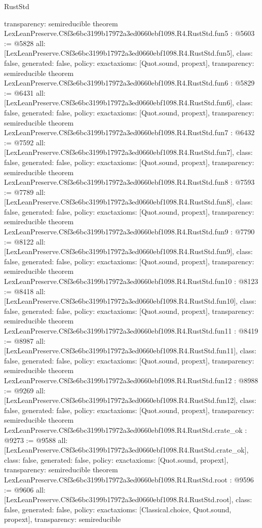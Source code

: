 \begin{lexlean}{RustStd}
\begin{coremodule}
{  transparency: semireducible
}
theorem LexLeanPreserve.C8f3e6bc3199b17972a3ed0660ebf1098.R4.RustStd.fun5 : @5603 := @5828 {
  all: [LexLeanPreserve.C8f3e6bc3199b17972a3ed0660ebf1098.R4.RustStd.fun5],
  class: false,
  generated: false,
  policy: exact{axioms: [Quot.sound, propext]},
  transparency: semireducible
}
theorem LexLeanPreserve.C8f3e6bc3199b17972a3ed0660ebf1098.R4.RustStd.fun6 : @5829 := @6431 {
  all: [LexLeanPreserve.C8f3e6bc3199b17972a3ed0660ebf1098.R4.RustStd.fun6],
  class: false,
  generated: false,
  policy: exact{axioms: [Quot.sound, propext]},
  transparency: semireducible
}
theorem LexLeanPreserve.C8f3e6bc3199b17972a3ed0660ebf1098.R4.RustStd.fun7 : @6432 := @7592 {
  all: [LexLeanPreserve.C8f3e6bc3199b17972a3ed0660ebf1098.R4.RustStd.fun7],
  class: false,
  generated: false,
  policy: exact{axioms: [Quot.sound, propext]},
  transparency: semireducible
}
theorem LexLeanPreserve.C8f3e6bc3199b17972a3ed0660ebf1098.R4.RustStd.fun8 : @7593 := @7789 {
  all: [LexLeanPreserve.C8f3e6bc3199b17972a3ed0660ebf1098.R4.RustStd.fun8],
  class: false,
  generated: false,
  policy: exact{axioms: [Quot.sound, propext]},
  transparency: semireducible
}
theorem LexLeanPreserve.C8f3e6bc3199b17972a3ed0660ebf1098.R4.RustStd.fun9 : @7790 := @8122 {
  all: [LexLeanPreserve.C8f3e6bc3199b17972a3ed0660ebf1098.R4.RustStd.fun9],
  class: false,
  generated: false,
  policy: exact{axioms: [Quot.sound, propext]},
  transparency: semireducible
}
theorem LexLeanPreserve.C8f3e6bc3199b17972a3ed0660ebf1098.R4.RustStd.fun10 : @8123 := @8418 {
  all: [LexLeanPreserve.C8f3e6bc3199b17972a3ed0660ebf1098.R4.RustStd.fun10],
  class: false,
  generated: false,
  policy: exact{axioms: [Quot.sound, propext]},
  transparency: semireducible
}
theorem LexLeanPreserve.C8f3e6bc3199b17972a3ed0660ebf1098.R4.RustStd.fun11 : @8419 := @8987 {
  all: [LexLeanPreserve.C8f3e6bc3199b17972a3ed0660ebf1098.R4.RustStd.fun11],
  class: false,
  generated: false,
  policy: exact{axioms: [Quot.sound, propext]},
  transparency: semireducible
}
theorem LexLeanPreserve.C8f3e6bc3199b17972a3ed0660ebf1098.R4.RustStd.fun12 : @8988 := @9269 {
  all: [LexLeanPreserve.C8f3e6bc3199b17972a3ed0660ebf1098.R4.RustStd.fun12],
  class: false,
  generated: false,
  policy: exact{axioms: [Quot.sound, propext]},
  transparency: semireducible
}
theorem LexLeanPreserve.C8f3e6bc3199b17972a3ed0660ebf1098.R4.RustStd.crate_ok : @9273 := @9588 {
  all: [LexLeanPreserve.C8f3e6bc3199b17972a3ed0660ebf1098.R4.RustStd.crate_ok],
  class: false,
  generated: false,
  policy: exact{axioms: [Quot.sound, propext]},
  transparency: semireducible
}
theorem LexLeanPreserve.C8f3e6bc3199b17972a3ed0660ebf1098.R4.RustStd.root : @9596 := @9606 {
  all: [LexLeanPreserve.C8f3e6bc3199b17972a3ed0660ebf1098.R4.RustStd.root],
  class: false,
  generated: false,
  policy: exact{axioms: [Classical.choice, Quot.sound, propext]},
  transparency: semireducible
}


\end{coremodule}
\end{lexlean}
